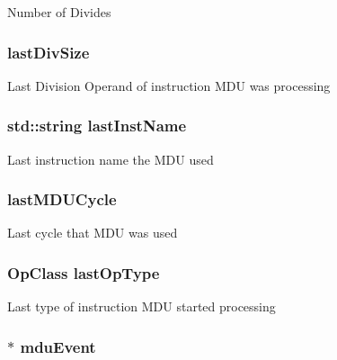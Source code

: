 \label{classMultDivUnit_af00ce09d1fb90b720ca50018e34ad41b}
Number of Divides \hypertarget{classMultDivUnit_a075ef274f01d991e6536962af9c769b3}{
\subsubsection[{lastDivSize}]{ {\bf lastDivSize}}}
\label{classMultDivUnit_a075ef274f01d991e6536962af9c769b3}
Last Division Operand of instruction MDU was processing \hypertarget{classMultDivUnit_a1996f8a5fafe7c1b2a1c0ffb643dbcf3}{
\subsubsection[{lastInstName}]{\setlength{\rightskip}{0pt plus 5cm}std::string {\bf lastInstName}}}
\label{classMultDivUnit_a1996f8a5fafe7c1b2a1c0ffb643dbcf3}
Last instruction name the MDU used \hypertarget{classMultDivUnit_a59ab9df8fd6e708fee0ecd5088fdd42d}{
\subsubsection[{lastMDUCycle}]{ {\bf lastMDUCycle}}}
\label{classMultDivUnit_a59ab9df8fd6e708fee0ecd5088fdd42d}
Last cycle that MDU was used \hypertarget{classMultDivUnit_a062c172670b1305b3cad0920b002e8a2}{
\subsubsection[{lastOpType}]{\setlength{\rightskip}{0pt plus 5cm}OpClass {\bf lastOpType}}}
\label{classMultDivUnit_a062c172670b1305b3cad0920b002e8a2}
Last type of instruction MDU started processing \hypertarget{classMultDivUnit_ab6780ac541ff360807ea8d60676f16ed}{
\subsubsection[{mduEvent}]{$\ast$ {\bf mduEvent}}}
